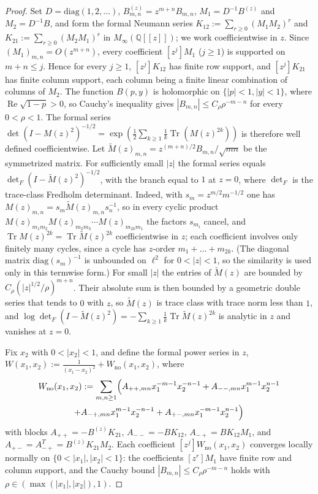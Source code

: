 \documentclass[twoside,10pt]{article}
\numberwithin{equation}{section}
\theoremstyle{slbody}
\theoremstyle{definition}
\theoremstyle{remark}
\newcommand{\Tr}{\operatorname{Tr}}
\begin{document}
\begin{proof}
Set \(D=\mathrm{diag}(1,2,\dots)\), \(B^{(z)}_{m,n}=z^{m+n}B_{m,n}\),
\(M_1=D^{-1}B^{(z)}\) and \(M_2=D^{-1}B\), and form the formal Neumann series
\(K_{12}:=\sum_{r\geq0}(M_1M_2)^r\) and \(K_{21}:=\sum_{r\geq0}(M_2M_1)^r\) in
\(M_\infty(\mathbb Q[[z]])\); we work coefficientwise in \(z\).  Since
\((M_1)_{m,n}=O(z^{m+n})\), every coefficient \([z^j]M_1\) (\(j\geq1\)) is
supported on \(m+n\leq j\).  Hence for every \(j\geq1\), \([z^j]K_{12}\) has
finite row support, and \([z^j]K_{21}\) has finite column support, each column
being a finite linear combination of columns of \(M_2\).  The function
\(B(p,y)\) is holomorphic on \(\{|p|<1,|y|<1\}\), where
\(\operatorname{Re}\sqrt{1-p}>0\), so Cauchy's inequality gives
\(|B_{m,n}|\leq C_\rho\rho^{-m-n}\) for every \(0<\rho<1\).  The formal series
\(\det(I-M(z)^2)^{-1/2}=\exp(\frac12\sum_{k\geq1}\frac1k\Tr(M(z)^{2k}))\) is
therefore well defined coefficientwise.  Let \(\widetilde M(z)_{m,n}=z^{(m+n)/2}B_{m,n}/\sqrt{mn}\) be the
symmetrized matrix.  For sufficiently small \(|z|\) the formal series equals
\(\det_F(I-\widetilde M(z)^2)^{-1/2}\), with the branch equal to \(1\) at
\(z=0\), where \(\det_F\) is the trace-class Fredholm determinant.  Indeed,
with \(s_m=z^{m/2}m^{-1/2}\) one has
\(M(z)_{m,n}=s_m\widetilde M(z)_{m,n}s_n^{-1}\), so in every cyclic product
\(M(z)_{m_1m_2}M(z)_{m_2m_3}\cdots M(z)_{m_{2k}m_1}\) the factors \(s_{m_i}\)
cancel, and \(\Tr M(z)^{2k}=\Tr\widetilde M(z)^{2k}\) coefficientwise in
\(z\); each coefficient involves only finitely many cycles, since a cycle
has \(z\)-order \(m_1+\dots+m_{2k}\).  (The diagonal matrix
\(\mathrm{diag}(s_m)^{-1}\) is unbounded on \(\ell^2\) for \(0<|z|<1\), so the
similarity is used only in this termwise form.)  For small \(|z|\) the
entries of \(\widetilde M(z)\) are bounded by \(C_\rho(|z|^{1/2}/\rho)^{m+n}\).
Their absolute sum is then bounded by a geometric double series that tends to
\(0\) with \(z\), so \(\widetilde M(z)\) is trace class with trace norm less
than \(1\), and
\(\log\det_F(I-\widetilde M(z)^2)=-\sum_{k\geq1}\frac1k\Tr\widetilde M(z)^{2k}\)
is analytic in \(z\) and vanishes at \(z=0\).

Fix \(x_2\) with \(0<|x_2|<1\), and define the formal power series in \(z\),
\(W(x_1,x_2):=\frac{1}{(x_1-x_2)^2}+W_{\mathrm{no}}(x_1,x_2)\), where
\begin{multline*}
 W_{\mathrm{no}}(x_1,x_2)
 :=\sum_{m,n\geq1}\Bigl(A_{++,mn}x_1^{-m-1}x_2^{-n-1}+A_{--,mn}x_1^{m-1}x_2^{n-1}\\
  +A_{-+,mn}x_1^{m-1}x_2^{-n-1}+A_{+-,mn}x_1^{-m-1}x_2^{n-1}\Bigr)
\end{multline*}
with blocks \(A_{++}=-B^{(z)}K_{21}\), \(A_{--}=-BK_{12}\),
\(A_{-+}=BK_{12}M_1\), and \(A_{+-}=A_{-+}^T=B^{(z)}K_{21}M_2\).  Each
coefficient \([z^j]W_{\mathrm{no}}(x_1,x_2)\) converges locally normally on
\(\{0<|x_1|,|x_2|<1\}\): the coefficients \([z^r]M_1\) have finite row and
column support, and the Cauchy bound \(|B_{m,n}|\leq C_\rho\rho^{-m-n}\) holds
with \(\rho\in(\max(|x_1|,|x_2|),1)\).


\end{proof}
\end{document}

